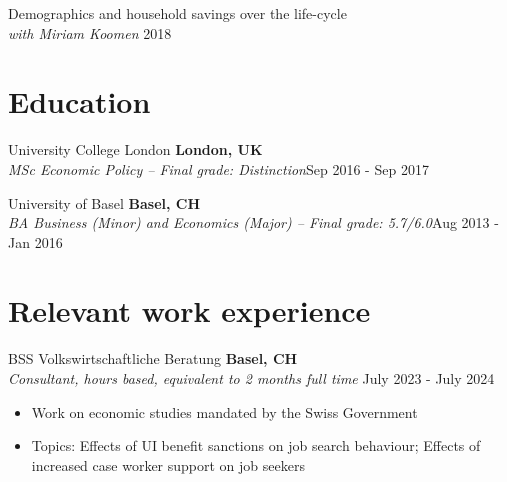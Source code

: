 \documentclass[letter, 11pt]{res}
\begin{document}
\begin{resume}
Demographics and household savings over the life-cycle  \\
{\sl with Miriam Koomen} \hfill 2018


\vspace{0.5cm}
\section{Education}
\vspace{1mm}
University College London \hfill \textbf{London, UK} \\
\textit{MSc Economic Policy -- Final grade: Distinction}\hfill Sep 2016 - Sep 2017

University of Basel \hfill \textbf{Basel, CH} \\
\textit{BA Business (Minor) and Economics (Major) -- Final grade: 5.7/6.0}\hfill Aug 2013 - Jan 2016


\vspace{0.5cm}
\section{Relevant work experience}
\vspace{1mm}
BSS Volkswirtschaftliche Beratung \hfill \textbf{Basel, CH} \\
{\sl Consultant, hours based, equivalent to 2 months full time} \hfill July 2023 - July 2024
\begin{itemize}[topsep=0pt]
\item[--] Work on economic studies mandated by the Swiss Government
\item[--] Topics: Effects of UI benefit sanctions on job search behaviour; Effects of increased case worker support on job seekers
\end{itemize}


\end{resume}
\end{document}
